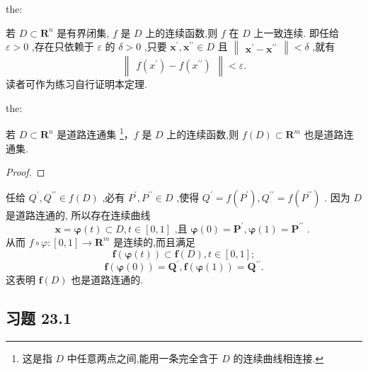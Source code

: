 \begin{theorem}{}{the:}

\end{theorem}
 若 \(D \subset  {\mathbf{R}}^{n}\) 是有界闭集, \(f\) 是 \(D\) 上的连续函数,则 \(f\) 在 \(D\) 上一致连续. 即任给 \(\varepsilon  > 0\) ,存在只依赖于 \(\varepsilon\) 的 \(\delta  > 0\) ,只要 \({\mathbf{x}}^{\prime },{\mathbf{x}}^{\prime \prime } \in  D\) 且 \(\begin{Vmatrix}{{\mathbf{x}}^{\prime } - {\mathbf{x}}^{\prime \prime }}\end{Vmatrix} < \delta\) ,就有
\[
\begin{Vmatrix}{f\left( {x}^{\prime }\right)  - f\left( {x}^{\prime \prime }\right) }\end{Vmatrix} < \varepsilon .
\]
读者可作为练习自行证明本定理.

\begin{theorem}{}{the:}

\end{theorem}
 若 \(D \subset  {\mathbf{R}}^{n}\) 是道路连通集 \footnote{这是指 \(D\) 中任意两点之间,能用一条完全含于 \(D\) 的连续曲线相连接.}，\(f\) 是 \(D\) 上的连续函数,则 \(f\left( D\right)  \subset  {\mathbf{R}}^{m}\) 也是道路连通集.

\begin{proof}

\end{proof}
任给 \({Q}^{\prime },{Q}^{\prime \prime } \in  f\left( D\right)\) ,必有 \({P}^{\prime },{P}^{\prime \prime } \in  D\) ,使得 \({Q}^{\prime } = f\left( {P}^{\prime }\right) ,{Q}^{\prime \prime } = f\left( {P}^{\prime \prime }\right)\) . 因为 \(D\) 是道路连通的, 所以存在连续曲线
\[
\mathbf{x} = \mathbf{\varphi }\left( t\right)  \subset  D,t \in  \left\lbrack  {0,1}\right\rbrack  \text{ ,且 }\mathbf{\varphi }\left( 0\right)  = {\mathbf{P}}^{\prime },\mathbf{\varphi }\left( 1\right)  = {\mathbf{P}}^{\prime \prime }\text{ . }
\]
从而 \(f \circ  \varphi  : \left\lbrack  {0,1}\right\rbrack   \rightarrow  {\mathbf{R}}^{m}\) 是连续的,而且满足
\[
\mathbf{f}\left( {\mathbf{\varphi }\left( t\right) }\right)  \subset  \mathbf{f}\left( D\right) ,t \in  \left\lbrack  {0,1}\right\rbrack  ;
\]
\[
\mathbf{f}\left( {\mathbf{\varphi }\left( 0\right) }\right)  = {\mathbf{Q}}^{\prime },\mathbf{f}\left( {\mathbf{\varphi }\left( 1\right) }\right)  = {\mathbf{Q}}^{\prime \prime }.
\]
这表明 \(\mathbf{f}\left( D\right)\) 也是道路连通的.

\subsection{习题 23.1}

